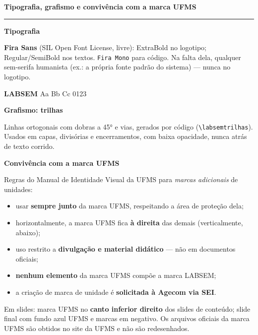 \documentclass[a4paper,landscape,10pt]{article}
\newcommand{\titulo}[1]{{\color{labsemMarinho}\LARGE\bfseries #1}\par
  {\color{labsemCobre}\rule{24mm}{1.2mm}}\par\vspace{4mm}}
\begin{document}
\titulo{Tipografia, grafismo e convivência com a marca UFMS}
\begin{minipage}[t]{0.47\textwidth}
{\color{labsemMarinho}\bfseries Tipografia}\par
\textbf{Fira Sans} (SIL Open Font License, livre): ExtraBold no logotipo; Regular/SemiBold
nos textos. \texttt{Fira Mono} para código. Na falta dela, qualquer sem-serifa humanista
(ex.: a própria fonte padrão do sistema) --- nunca no logotipo.

\vspace{2mm}
{\fontsize{26}{28}\selectfont\color{labsemMarinho}\bfseries LABSEM}\quad
{\Large Aa Bb Cc 0123}

\vspace{6mm}
{\color{labsemMarinho}\bfseries Grafismo: trilhas}\par
Linhas ortogonais com dobras a 45° e vias, gerados por código (\texttt{\textbackslash labsemtrilhas}).
Usados em capas, divisórias e encerramentos, com baixa opacidade, nunca atrás de texto corrido.\par
{}
\end{minipage}\hfill
\begin{minipage}[t]{0.47\textwidth}
{\color{labsemMarinho}\bfseries Convivência com a marca UFMS}\par
Regras do Manual de Identidade Visual da UFMS para \emph{marcas adicionais} de unidades:
\begin{itemize}\setlength\itemsep{1pt}
  \item usar \textbf{sempre junto} da marca UFMS, respeitando a área de proteção dela;
  \item horizontalmente, a marca UFMS fica \textbf{à direita} das demais (verticalmente, abaixo);
  \item uso restrito a \textbf{divulgação e material didático} --- não em documentos oficiais;
  \item \textbf{nenhum elemento} da marca UFMS compõe a marca LABSEM;
  \item a criação de marca de unidade é \textbf{solicitada à Agecom via SEI}.
\end{itemize}
Em slides: marca UFMS no \textbf{canto inferior direito} dos slides de conteúdo; slide final
com fundo azul UFMS e marcas em negativo. Os arquivos oficiais da marca UFMS são obtidos no
site da UFMS e não são redesenhados.

\vspace{3mm}
\end{minipage}
\end{document}
